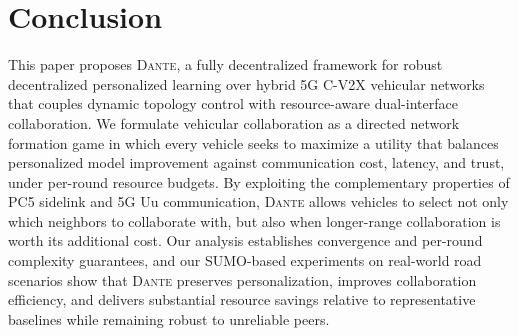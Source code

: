 \section{Conclusion}
\label{sec:conclusion}

This paper proposes \textsc{Dante}, a fully decentralized framework for robust decentralized personalized learning over hybrid 5G C-V2X vehicular networks that couples dynamic topology control with resource-aware dual-interface collaboration. We formulate vehicular collaboration as a directed network formation game in which every vehicle seeks to maximize a utility that balances personalized model improvement against communication cost, latency, and trust, under per-round resource budgets. By exploiting the complementary properties of PC5 sidelink and 5G Uu communication, \textsc{Dante} allows vehicles to select not only which neighbors to collaborate with, but also when longer-range collaboration is worth its additional cost. Our analysis establishes convergence and per-round complexity guarantees, and our SUMO-based experiments on real-world road scenarios show that \textsc{Dante} preserves personalization, improves collaboration efficiency, and delivers substantial resource savings relative to representative baselines while remaining robust to unreliable peers.

